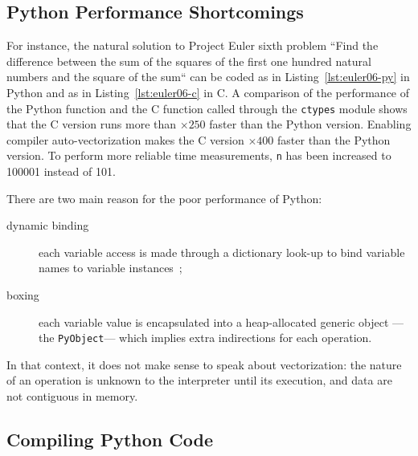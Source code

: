\documentclass[preprint]{sigplanconf}
\begin{document}
\subsection{Python Performance Shortcomings}

For instance, the natural solution to Project Euler sixth problem ``Find the
difference between the sum of the squares of the first one hundred natural
numbers and the square of the sum`` can be coded as in
Listing~\ref{lst:euler06-py} in Python and as in Listing~\ref{lst:euler06-c} in
C. A comparison of the performance of the Python function and the C function
called through the \texttt{ctypes} module shows that the C version runs more
than $\times250$ faster than the Python version. Enabling compiler
auto-vectorization makes the C version $\times400$ faster than the Python
version. To perform more reliable time measurements, \texttt{n} has been
increased to 100001 instead of 101.

There are two main reason for the poor performance of Python:

\begin{description}

    \item[dynamic binding] each variable access is made through a dictionary
        look-up to bind variable names to variable instances~;

    \item[boxing] each variable value is encapsulated into a heap-allocated
        generic object ---the \texttt{PyObject}--- which implies extra
        indirections for each operation.

\end{description}

In that context, it does not make sense to speak about vectorization: the
nature of an operation is unknown to the interpreter until its execution, and
data are not contiguous in memory.






\subsection{Compiling Python Code}
\end{document}
